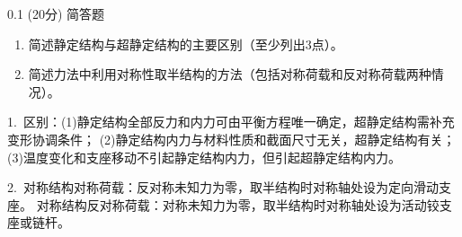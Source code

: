 \begin{question}{0.1}
(20分) 简答题
\begin{enumerate}
\item 简述静定结构与超静定结构的主要区别（至少列出3点）。
\item 简述力法中利用对称性取半结构的方法（包括对称荷载和反对称荷载两种情况）。
\end{enumerate}
\end{question}

\begin{solution}
1.~区别：(1)静定结构全部反力和内力可由平衡方程唯一确定，超静定结构需补充变形协调条件；
(2)静定结构内力与材料性质和截面尺寸无关，超静定结构有关；
(3)温度变化和支座移动不引起静定结构内力，但引起超静定结构内力。

2.~对称结构对称荷载：反对称未知力为零，取半结构时对称轴处设为定向滑动支座。
对称结构反对称荷载：对称未知力为零，取半结构时对称轴处设为活动铰支座或链杆。
\end{solution}
